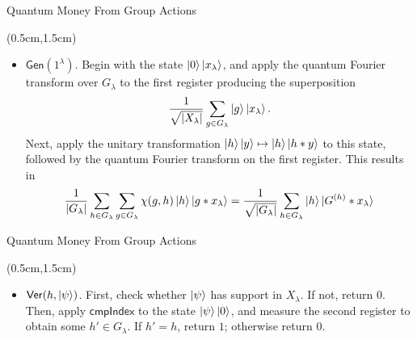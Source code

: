 \documentclass{beamer}
\theoremstyle{definition}
\newcommand{\comph}{\mathsf{cmpIndex}}
\newcommand{\gen}{\mathsf{Gen}}
\newcommand{\ver}{\mathsf{Ver}}
\begin{document}
\begin{frame}{Quantum Money From Group Actions}
    
    \begin{textblock*}{12cm}(0.5cm,1.5cm)
            
        
        \begin{itemize}
        \item $\gen(1^\lambda)$. Begin with the state $\ket{0}\ket{x_\lambda}$, and apply the quantum Fourier transform over $G_\lambda$ to the first register producing the superposition
        \[ \frac{1}{\sqrt{{|X_\lambda|}}} \sum_{g \in G_\lambda} \ket{g}\ket{x_\lambda}. \]
        Next, apply the unitary transformation $\ket{h}\ket{y} \mapsto \ket{h}\ket{h * y}$ to this state, followed by the quantum Fourier transform on the first register. This results in
        \[ \frac{1}{{|G_\lambda|}} \sum_{h \in G_\lambda} \sum_{g \in G_\lambda} \chi(g, h) \ket{h}\ket{g * x_\lambda} = \frac{1}{\sqrt{{|G_\lambda|}}} \sum_{h \in G_\lambda} \ket{h} \ket{G^{(h)} * x_\lambda} \]

        \end{itemize}

        
    \end{textblock*}


\end{frame}




\begin{frame}{Quantum Money From Group Actions}
    
    \begin{textblock*}{12cm}(0.5cm,1.5cm)
            
        
        \begin{itemize}
        \item $\ver(h, \ket{\psi})$. First, check whether $\ket{\psi}$ has support in $X_\lambda$. If not, return $0$. Then, apply $\comph$ to the state $\ket{\psi}\ket{0}$, and measure the second register to obtain some $h' \in G_\lambda$. If $h' = h$, return $1$; otherwise return $0$.
        \end{itemize}

        
    \end{textblock*}


\end{frame}
\end{document}
